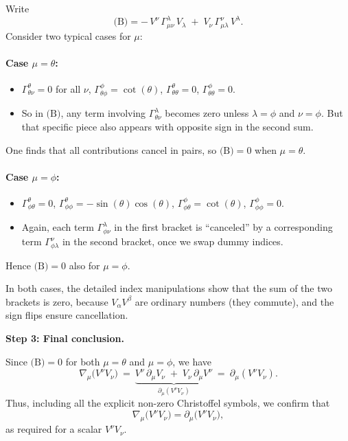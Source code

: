\documentclass{article}
\begin{document}
Write
\[
\text{(B)}
=
-\,V^\nu\,\Gamma^\lambda_{\mu\nu}\,V_\lambda
\;+\;
V_\nu\,\Gamma^\nu_{\mu\lambda}\,V^\lambda.
\]
Consider two typical cases for \(\mu\):

\paragraph{Case \(\mu = \theta\):}

\begin{itemize}
\item \(\Gamma^\theta_{\theta\nu} = 0\) for all \(\nu\),
\(\Gamma^\phi_{\theta\phi} = \cot(\theta)\),
\(\Gamma^\theta_{\theta\theta} = 0\), \(\Gamma^\phi_{\theta\theta}=0\).
\item So in \(\text{(B)}\), any term involving \(\Gamma^\lambda_{\theta\nu}\) becomes zero unless \(\lambda=\phi\) and \(\nu=\phi\). But that specific piece also appears with opposite sign in the second sum.
\end{itemize}
One finds that all contributions cancel in pairs, so \(\text{(B)}=0\) when \(\mu=\theta\).

\paragraph{Case \(\mu = \phi\):}

\begin{itemize}
\item \(\Gamma^\theta_{\phi\theta} = 0\), \(\Gamma^\theta_{\phi\phi}=-\sin(\theta)\cos(\theta)\),
\(\Gamma^\phi_{\phi\theta}=\cot(\theta)\), \(\Gamma^\phi_{\phi\phi} = 0\).
\item Again, each term \(\Gamma^\lambda_{\phi\nu}\) in the first bracket is “canceled” by a corresponding term \(\Gamma^\nu_{\phi\lambda}\) in the second bracket, once we swap dummy indices.
\end{itemize}
Hence \(\text{(B)}=0\) also for \(\mu=\phi\).

In both cases, the detailed index manipulations show that the sum of the two brackets is zero, because \(V_\alpha V^\beta\) are ordinary numbers (they commute), and the sign flips ensure cancellation.

\medskip

\noindent
\textbf{Step 3: Final conclusion.}

Since \(\text{(B)}=0\) for both \(\mu=\theta\) and \(\mu=\phi\), we have
\[
\nabla_\mu \bigl(V^\nu V_\nu\bigr)
~=~
\underbrace{V^\nu\,\partial_\mu V_\nu \;+\; V_\nu\,\partial_\mu V^\nu}_{\partial_\mu (V^\nu V_\nu)}
~=~
\partial_\mu (V^\nu V_\nu).
\]
Thus, including all the explicit non-zero Christoffel symbols, we confirm that
\[
\nabla_{\mu}\bigl(V^{\nu} V_{\nu}\bigr)
=
\partial_{\mu}\bigl(V^{\nu} V_{\nu}\bigr),
\]
as required for a scalar \(V^\nu V_\nu\).
\end{document}
